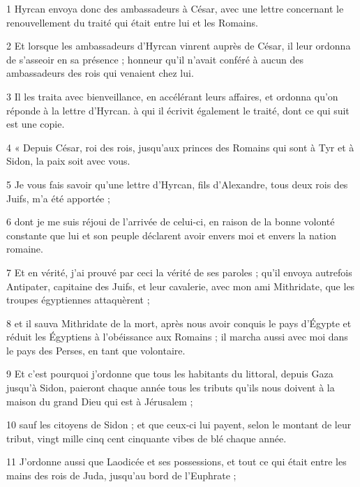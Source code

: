 \par 1 Hyrcan envoya donc des ambassadeurs à César, avec une lettre concernant le renouvellement du traité qui était entre lui et les Romains.

\par 2 Et lorsque les ambassadeurs d'Hyrcan vinrent auprès de César, il leur ordonna de s'asseoir en sa présence ; honneur qu'il n'avait conféré à aucun des ambassadeurs des rois qui venaient chez lui.

\par 3 Il les traita avec bienveillance, en accélérant leurs affaires, et ordonna qu'on réponde à la lettre d'Hyrcan. à qui il écrivit également le traité, dont ce qui suit est une copie.

\par 4 « Depuis César, roi des rois, jusqu'aux princes des Romains qui sont à Tyr et à Sidon, la paix soit avec vous.

\par 5 Je vous fais savoir qu'une lettre d'Hyrcan, fils d'Alexandre, tous deux rois des Juifs, m'a été apportée ;

\par 6 dont je me suis réjoui de l'arrivée de celui-ci, en raison de la bonne volonté constante que lui et son peuple déclarent avoir envers moi et envers la nation romaine.

\par 7 Et en vérité, j'ai prouvé par ceci la vérité de ses paroles ; qu'il envoya autrefois Antipater, capitaine des Juifs, et leur cavalerie, avec mon ami Mithridate, que les troupes égyptiennes attaquèrent ;

\par 8 et il sauva Mithridate de la mort, après nous avoir conquis le pays d'Égypte et réduit les Égyptiens à l'obéissance aux Romains ; il marcha aussi avec moi dans le pays des Perses, en tant que volontaire.

\par 9 Et c'est pourquoi j'ordonne que tous les habitants du littoral, depuis Gaza jusqu'à Sidon, paieront chaque année tous les tributs qu'ils nous doivent à la maison du grand Dieu qui est à Jérusalem ;

\par 10 sauf les citoyens de Sidon ; et que ceux-ci lui payent, selon le montant de leur tribut, vingt mille cinq cent cinquante vibes de blé chaque année.

\par 11 J'ordonne aussi que Laodicée et ses possessions, et tout ce qui était entre les mains des rois de Juda, jusqu'au bord de l'Euphrate ;

